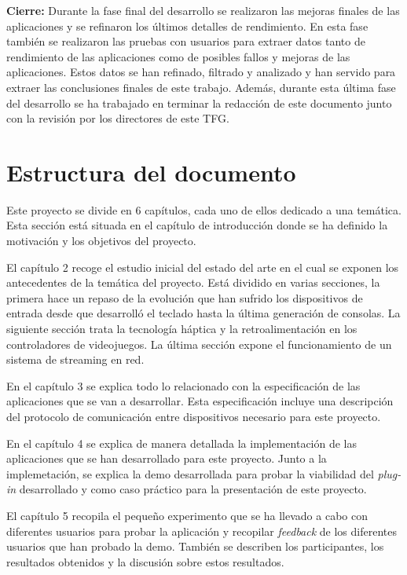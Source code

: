 \textbf{Cierre:} Durante la fase final del desarrollo se realizaron las mejoras finales de las aplicaciones y se refinaron los \'ultimos detalles de rendimiento. En esta fase tambi\'en se realizaron las pruebas con usuarios para extraer datos tanto de rendimiento de las aplicaciones como de posibles fallos y mejoras de las aplicaciones. Estos datos se han refinado, filtrado y analizado y han servido para extraer las conclusiones finales de este trabajo. Adem\'as, durante esta \'ultima fase del desarrollo se ha trabajado en terminar la redacci\'on de este documento junto con la revisi\'on por los directores de este TFG. 

\section{Estructura del documento}

Este proyecto se divide en 6 cap\'itulos, cada uno de ellos dedicado a una tem\'atica. Esta secci\'on est\'a situada en el cap\'itulo de introducci\'on donde se ha definido la motivaci\'on y los objetivos del proyecto.

El cap\'itulo 2 recoge el estudio inicial del estado del arte en el cual se exponen los antecedentes de la tem\'atica del proyecto. Est\'a dividido en varias secciones, la primera hace un repaso de la evoluci\'on que han sufrido los dispositivos de entrada desde que desarroll\'o el teclado hasta la \'ultima generaci\'on de consolas. La siguiente secci\'on trata la tecnolog\'ia h\'aptica y la retroalimentaci\'on en los controladores de videojuegos. La \'ultima secci\'on expone el funcionamiento de un sistema de streaming en red.

En el cap\'itulo 3 se explica todo lo relacionado con la especificaci\'on de las aplicaciones que se van a desarrollar. Esta especificaci\'on incluye una descripci\'on del protocolo de comunicaci\'on entre dispositivos necesario para este proyecto.

En el cap\'itulo 4 se explica de manera detallada la implementaci\'on de las aplicaciones que se han desarrollado para este proyecto. Junto a la implemetaci\'on, se explica la demo desarrollada para probar la viabilidad del \textit{plug-in} desarrollado y como caso pr\'actico para la presentaci\'on de este proyecto. 

El cap\'itulo 5 recopila el peque\~no experimento que se ha llevado a cabo con diferentes usuarios para probar la aplicaci\'on y recopilar \textit{feedback} de los diferentes usuarios que han probado la demo. Tambi\'en se describen los participantes, los resultados obtenidos y la discusi\'on sobre estos resultados.

